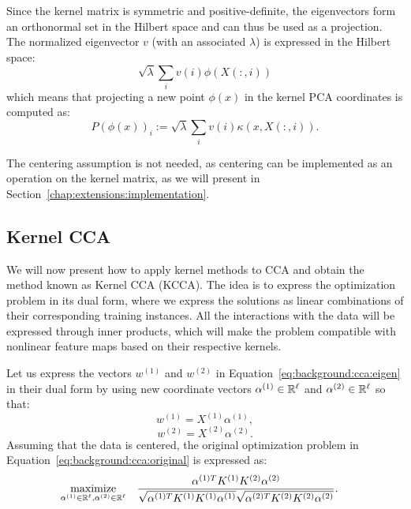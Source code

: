 Since the kernel matrix is symmetric and positive-definite, the eigenvectors form an orthonormal set in the Hilbert space and
can thus be used as a projection. The normalized eigenvector $v$ (with an associated $\lambda$) is expressed in the Hilbert space:
$$ \sqrt{\lambda} \sum_i v(i) \phi(X(:,i))$$
which means that projecting a new point $\phi(x)$ in the kernel PCA coordinates is computed as:
$$P(\phi(x))_i := \sqrt{\lambda} \sum_i v(i) \kappa(x, X(:,i)).$$

The centering assumption is not needed, as centering can be implemented as an operation on the kernel matrix, as we will
present in Section~\ref{chap:extensions:implementation}.

\subsection{Kernel CCA}

We will now present how to apply kernel methods to CCA and obtain the method known as Kernel CCA (KCCA).
The idea is to express the optimization problem in its dual form, where we express the solutions as
linear combinations of their corresponding training instances. All the interactions with the data
will be expressed through inner products, which will make the problem compatible with nonlinear feature
maps based on their respective kernels.

Let us express the vectors $w^{(1)}$ and $w^{(2)}$ in Equation~\ref{eq:background:cca:eigen} in their
dual form by using new coordinate vectors $\alpha^{(1)} \in \mathbb{R}^\ell$ and $\alpha^{(2)} \in \mathbb{R}^\ell$
so that:
$$w^{(1)} = X^{(1)} \alpha^{(1)},$$
$$w^{(2)} = X^{(2)} \alpha^{(2)}.$$
Assuming that the data is centered, the original optimization problem in Equation~\ref{eq:background:cca:original}
is expressed as:
\begin{equation}\label{eq:background:cca:original}
\begin{aligned}
& \underset{\alpha^{(1)} \in \mathbb{R}^{\ell}, \alpha^{(2)} \in \mathbb{R}^{\ell}}{\text{maximize}}
& & \frac{\alpha^{(1)T} K^{(1)} K^{(2)} \alpha^{(2)}}{\sqrt{\alpha^{(1)T} K^{(1)}K^{(1)} \alpha^{(1)}} \sqrt{\alpha^{(2)T} K^{(2)}K^{(2)} \alpha^{(2)}}}.
\end{aligned}
\end{equation}

